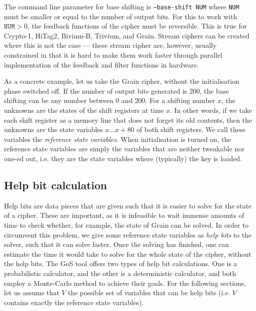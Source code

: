 \documentclass{llncs}
\begin{document}

The command line parameter for base shifting is \texttt{--base-shift NUM} where \texttt{NUM} must be smaller or equal to the number of output bits. For this to work with $\texttt{NUM}>0$, the feedback functions of the cipher must be reversible. This is true for Crypto-1, HiTag2, Bivium-B, Trivium, and Grain. Stream ciphers can be created where this is not the case --- these stream cipher are, however, usually constrained in that it is hard to make them work faster through parallel implementation of the feedback and filter functions in hardware.%

As a concrete example, let us take the Grain cipher, without the initialisation phase switched off. If the number of output bits generated is 200, the base shifting can be any number between 0 and 200. For a shifting number $x$, the unknowns are the states of the shift registers at time $x$. In other words, if we take each shift register as a memory line that does not forget its old contents, then the unknowns are the state variables $x\ldots x+80$ of both shift registers. We call these variables the \emph{reference state variables}. When initialisation is turned on, the reference state variables are simply the variables that are neither tweakable nor one-ed out, i.e. they are the state variables where (typically) the key is loaded.

\subsection{Help bit calculation}
Help bits are data pieces that are given such that it is easier to solve for the state of a cipher. These are important, as it is infeasible to wait immense amounts of time to check whether, for example, the state of Grain can be solved. In order to circumvent this problem, we give some reference state variables as \emph{help bits} to the solver, such that it can solve faster.  Once the solving has finished, one can estimate the time it would take to solve for the whole state of the cipher, without the help bits. The GoS tool offers two types of help bit calculations. One is a probabilistic calculator, and the other is a deterministic calculator, and both employ a Monte-Carlo method to achieve their goals. For the following sections, let us assume that $V$ the possible set of variables that can be help bits (i.e. $V$ contains exactly the reference state variables).
\end{document}
